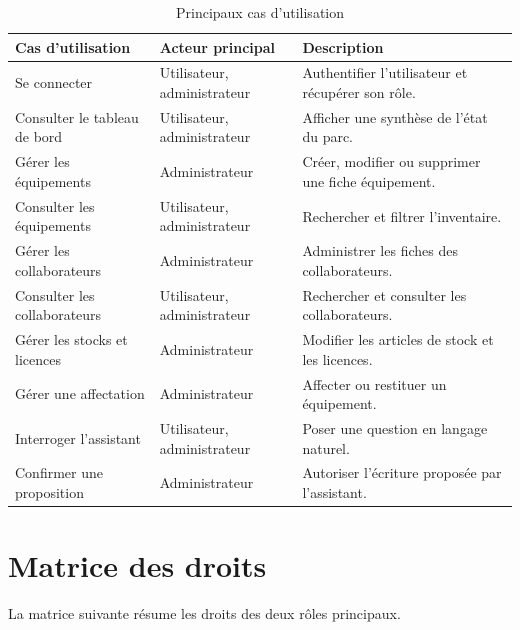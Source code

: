 \documentclass{rapportENSIAS}
\begin{document}
\begin{table}[htbp]
\centering
\caption{Principaux cas d’utilisation}
\label{tab:cas-utilisation}
\begin{tabular}{|p{4cm}|p{4cm}|p{5cm}|}
\hline
\textbf{Cas d’utilisation} & \textbf{Acteur principal} & \textbf{Description} \\
\hline
Se connecter & Utilisateur, administrateur & Authentifier l’utilisateur et récupérer son rôle. \\
\hline
Consulter le tableau de bord & Utilisateur, administrateur & Afficher une synthèse de l’état du parc. \\
\hline
Gérer les équipements & Administrateur & Créer, modifier ou supprimer une fiche équipement. \\
\hline
Consulter les équipements & Utilisateur, administrateur & Rechercher et filtrer l’inventaire. \\
\hline
Gérer les collaborateurs & Administrateur & Administrer les fiches des collaborateurs. \\
\hline
Consulter les collaborateurs & Utilisateur, administrateur & Rechercher et consulter les collaborateurs. \\
\hline
Gérer les stocks et licences & Administrateur & Modifier les articles de stock et les licences. \\
\hline
Gérer une affectation & Administrateur & Affecter ou restituer un équipement. \\
\hline
Interroger l’assistant & Utilisateur, administrateur & Poser une question en langage naturel. \\
\hline
Confirmer une proposition & Administrateur & Autoriser l’écriture proposée par l’assistant. \\
\hline
\end{tabular}
\end{table}

\section{Matrice des droits}

La matrice suivante résume les droits des deux rôles principaux.
\end{document}

